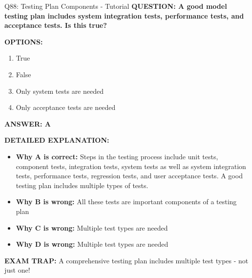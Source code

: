 \documentclass[8pt]{beamer}
\begin{document}
	\begin{frame}{Q88: Testing Plan Components - Tutorial}
		\fontsize{6.5}{7.5}\selectfont
		\textbf{QUESTION: A good model testing plan includes system integration tests, performance tests, and acceptance tests. Is this true?}
		
		\vspace{0.1cm}
		\textbf{OPTIONS:}
		\begin{enumerate}
			\item True
			\item False
			\item Only system tests are needed
			\item Only acceptance tests are needed
		\end{enumerate}
		
		\vspace{0.1cm}
		\textcolor{myblue}{\textbf{ANSWER: A}}
		
		\vspace{0.1cm}
		\textbf{DETAILED EXPLANATION:}
		\begin{itemize}
			\item \textbf{Why A is correct:} Steps in the testing process include unit tests, component tests, integration tests, system tests as well as system integration tests, performance tests, regression tests, and user acceptance tests. A good testing plan includes multiple types of tests.
			\item \textbf{Why B is wrong:} All these tests are important components of a testing plan
			\item \textbf{Why C is wrong:} Multiple test types are needed
			\item \textbf{Why D is wrong:} Multiple test types are needed
		\end{itemize}
		
		\textcolor{myred}{\textbf{EXAM TRAP:}} A comprehensive testing plan includes \textcolor{myblue}{multiple test types} - not just one!
	\end{frame}
	
\end{document}
